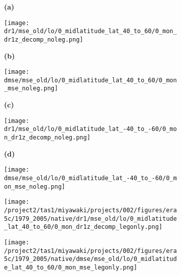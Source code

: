 \documentclass[preview]{standalone}
\begin{document}
\begin{figure}
  \begin{subfigure}[t]{0.05\textwidth}
    \textbf{\normalsize{(a)}}
  \end{subfigure}
  \begin{subfigure}[t]{0.45\textwidth}
    \texttt{[image: dr1/mse\_old/lo/0\_midlatitude\_lat\_40\_to\_60/0\_mon\_dr1z\_decomp\_noleg.png]}
  \end{subfigure}
  \begin{subfigure}[t]{0.05\textwidth}
    \textbf{\normalsize{(b)}}
  \end{subfigure}
  \begin{subfigure}[t]{0.45\textwidth}
    \texttt{[image: dmse/mse\_old/lo/0\_midlatitude\_lat\_40\_to\_60/0\_mon\_mse\_noleg.png]}
  \end{subfigure}

  \begin{subfigure}[t]{0.05\textwidth}
    \textbf{\normalsize{(c)}}
  \end{subfigure}
  \begin{subfigure}[t]{0.45\textwidth}
    \texttt{[image: dr1/mse\_old/lo/0\_midlatitude\_lat\_-40\_to\_-60/0\_mon\_dr1z\_decomp\_noleg.png]}
  \end{subfigure}
  \begin{subfigure}[t]{0.05\textwidth}
    \textbf{\normalsize{(d)}}
  \end{subfigure}
  \begin{subfigure}[t]{0.45\textwidth}
    \texttt{[image: dmse/mse\_old/lo/0\_midlatitude\_lat\_-40\_to\_-60/0\_mon\_mse\_noleg.png]}
  \end{subfigure}

  \begin{subfigure}[t]{0.05\textwidth}
  \end{subfigure}
  \begin{subfigure}[t]{0.45\textwidth}
    \texttt{[image: /project2/tas1/miyawaki/projects/002/figures/era5c/1979\_2005/native/dr1/mse\_old/lo/0\_midlatitude\_lat\_40\_to\_60/0\_mon\_dr1z\_decomp\_legonly.png]}
  \end{subfigure}
  \begin{subfigure}[t]{0.1\textwidth}
  \end{subfigure}
  \begin{subfigure}[t]{0.4\textwidth}
    \texttt{[image: /project2/tas1/miyawaki/projects/002/figures/era5c/1979\_2005/native/dmse/mse\_old/lo/0\_midlatitude\_lat\_40\_to\_60/0\_mon\_mse\_legonly.png]}
  \end{subfigure}

\end{figure}
\end{document}
